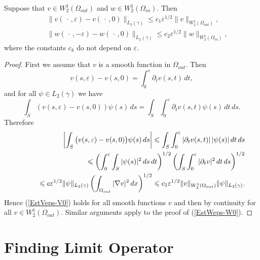 \documentclass[graybox]{svmult}
\newcommand{\eps}{\varepsilon}
\renewcommand{\leq}{\leqslant}
\newcommand{\eqref}[1]{(\ref{#1})}
\begin{document}
\begin{proposition}\label{PropTrace}
  Suppose that $v\in W_2^{1}(\Omega_{out})$  and $w\in W_2^{1}(\Omega_{in})$. Then
\begin{eqnarray}\label{EstVeps-V0}
&&\|v(\,\cdot\,,\eps)-v(\,\cdot\,,0)\|_{L_2(\gamma)}\leq
c_1\eps^{1/2}\|v\|_{W_2^1(\Omega_{out})}, \\\label{EstWeps-W0} &&\|w(\,\cdot\,,-\eps)-w(\,\cdot\,,0)\|_{L_2(\gamma)}\leq
c_2\eps^{1/2}\|w\|_{W_2^1(\Omega_{in})},
\end{eqnarray}
where the constants $c_k$ do not depend on $\eps$.
\end{proposition}
\begin{proof}
  First we assume that $v$ is a smooth function in $\Omega_{out}$. Then
$$
 v(s,\eps)-v(s,0)=\int_0^\eps \partial_t v(s,t)\,dt,
$$
and for all $\psi\in L_2(\gamma)$ we have
$$
\int_S(v(s,\eps)-v(s,0))\psi(s)\,ds=\int_S\int_0^\eps\partial_t v(s,t)\psi(s)\,dt\,ds.
$$
Therefore
\begin{eqnarray}\nonumber
&&\left|\int_S\big(v(s,\eps)-v(s,0)\big)\psi(s)\,ds\right|\leq
\int_S\int_0^\eps|\partial_t v(s,t)|\,|\psi(s)|\,dt\,ds
\\\nonumber
&&\kern20pt\leq \left(\int_0^\eps \int_S|\psi(s)|^2\,ds\,dt\right)^{1/2}
\left(\int_S\int_0^\eps |\partial_t v|^2\,dt\,ds\right)^{1/2}
\\\nonumber
&&\kern20pt\leq c\eps^{1/2}\|\psi\|_{L_2(\gamma)}
\left(\int_{\Omega_{out}}|\nabla v|^2\,dx\right)^{1/2}\leq c_1\eps^{1/2}\|v\|_{W_2^1(\Omega_{out})}\|\psi\|_{L_2(\gamma)}.
\end{eqnarray}
Hence \eqref{EstVeps-V0} holds for all smooth functions $v$ and then by continuity for all $v\in W_2^{1}(\Omega_{out})$.
Similar arguments apply to the proof of \eqref{EstWeps-W0}.
\end{proof}



\section{Finding Limit Operator}
\label{Sec:LimitOperator}
\end{document}
